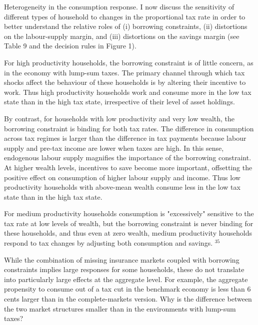 \documentclass[11pt]{article}
\begin{document}
Heterogeneity in the consumption response. I now discuss the sensitivity of different types of household to changes in the proportional tax rate in order to better understand the relative roles of (i) borrowing constraints, (ii) distortions on the labour-supply margin, and (iii) distortions on the savings margin (see Table 9 and the decision rules in Figure 1).

For high productivity households, the borrowing constraint is of little concern, as in the economy with lump-sum taxes. The primary channel through which tax shocks affect the behaviour of these households is by altering their incentive to work. Thus high productivity households work and consume more in the low tax state than in the high tax state, irrespective of their level of asset holdings.

By contrast, for households with low productivity and very low wealth, the borrowing constraint is binding for both tax rates. The difference in consumption across tax regimes is larger than the difference in tax payments because labour supply and pre-tax income are lower when taxes are high. In this sense, endogenous labour supply magnifies the importance of the borrowing constraint. At higher wealth levels, incentives to save become more important, offsetting the positive effect on consumption of higher labour supply and income. Thus low productivity households with above-mean wealth consume less in the low tax state than in the high tax state.

For medium productivity households consumption is "excessively" sensitive to the tax rate at low levels of wealth, but the borrowing constraint is never binding for these households, and thus even at zero wealth, medium productivity households respond to tax changes by adjusting both consumption and savings. ${ }^{35}$

While the combination of missing insurance markets coupled with borrowing constraints implies large responses for some households, these do not translate into particularly large effects at the aggregate level. For example, the aggregate propensity to consume out of a tax cut in the benchmark economy is less than 6 cents larger than in the complete-markets version. Why is the difference between the two market structures smaller than in the environments with lump-sum taxes?
\end{document}
